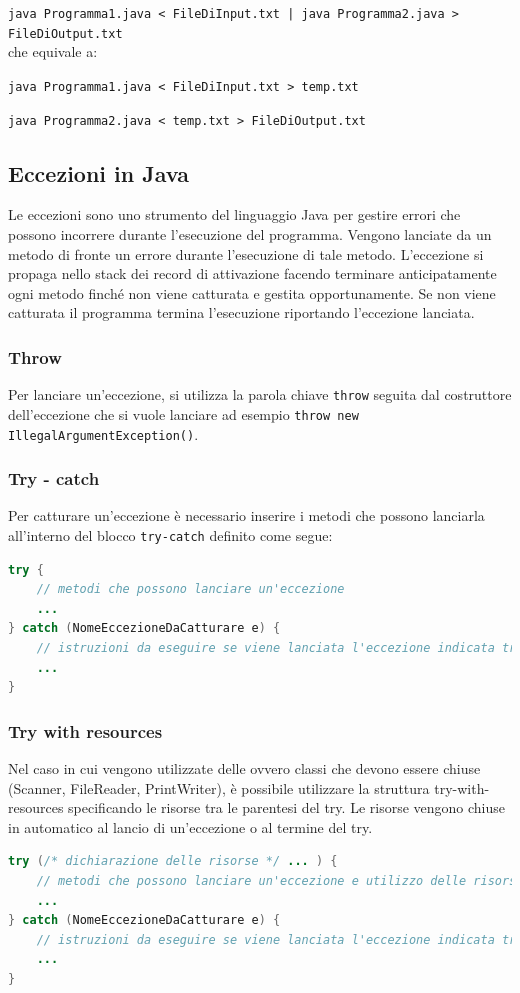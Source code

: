 \documentclass[a4paper]{article}
\begin{document}
\verb=java Programma1.java < FileDiInput.txt | java Programma2.java > FileDiOutput.txt=
\\
che equivale a:

\verb|java Programma1.java < FileDiInput.txt > temp.txt|

\verb|java Programma2.java < temp.txt > FileDiOutput.txt|

\newpage


\subsection{Eccezioni in Java}
Le eccezioni sono uno strumento del linguaggio Java per gestire errori che possono incorrere durante l'esecuzione del programma.
Vengono lanciate da un metodo di fronte un errore durante l'esecuzione di tale metodo. L'eccezione si propaga nello stack dei record
di attivazione facendo terminare anticipatamente ogni metodo finché non viene catturata e gestita opportunamente.
Se non viene catturata il programma termina l'esecuzione riportando l'eccezione lanciata.

\subsubsection*{Throw}
Per lanciare un'eccezione, si utilizza la parola chiave \verb|throw| seguita dal costruttore dell'eccezione che si vuole lanciare
ad esempio \verb|throw new IllegalArgumentException()|.

\subsubsection*{Try - catch}
Per catturare un'eccezione è necessario inserire i metodi che possono lanciarla all'interno del blocco \verb|try-catch|
definito come segue:
\begin{lstlisting}[language=Java]
try {
	// metodi che possono lanciare un'eccezione
	...
} catch (NomeEccezioneDaCatturare e) {
	// istruzioni da eseguire se viene lanciata l'eccezione indicata tra parentesi
	...
}
\end{lstlisting}

\subsubsection*{Try with resources}
Nel caso in cui vengono utilizzate delle  ovvero classi che devono essere chiuse (Scanner, FileReader, PrintWriter),
è possibile utilizzare la struttura try-with-resources specificando le risorse tra le parentesi del try. Le risorse vengono chiuse
in automatico al lancio di un'eccezione o al termine del try.
\begin{lstlisting}[language=Java]
try (/* dichiarazione delle risorse */ ... ) {
	// metodi che possono lanciare un'eccezione e utilizzo delle risorse
	...
} catch (NomeEccezioneDaCatturare e) {
	// istruzioni da eseguire se viene lanciata l'eccezione indicata tra parentesi
	...
}
\end{lstlisting}
\end{document}
